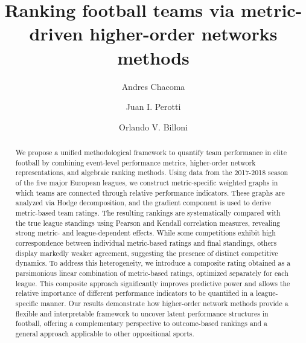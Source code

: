 \documentclass[preprint, amsmath,amssymb, pre]{revtex4-2}
\begin{document}
\title{Ranking football teams via metric-driven higher-order networks methods}




\author{Andres Chacoma}

\author{Juan I. Perotti}

\author{Orlando V. Billoni}


\begin{abstract}
We propose a unified methodological framework to quantify team performance in elite football by combining event-level performance metrics, higher-order network representations, and algebraic ranking methods. Using data from the 2017-2018 season of the five major European leagues, we construct metric-specific weighted graphs in which teams are connected through relative performance indicators. These graphs are analyzed via Hodge decomposition, and the gradient component is used to derive metric-based team ratings. The resulting rankings are systematically compared with the true league standings using Pearson and Kendall correlation measures, revealing strong metric- and league-dependent effects. While some competitions exhibit high correspondence between individual metric-based ratings and final standings, others display markedly weaker agreement, suggesting the presence of distinct competitive dynamics. To address this heterogeneity, we introduce a composite rating obtained as a parsimonious linear combination of metric-based ratings, optimized separately for each league. This composite approach significantly improves predictive power and allows the relative importance of different performance indicators to be quantified in a league-specific manner. Our results demonstrate how higher-order network methods provide a flexible and interpretable framework to uncover latent performance structures in football, offering a complementary perspective to outcome-based rankings and a general approach applicable to other oppositional sports.
\end{abstract}
\end{document}
